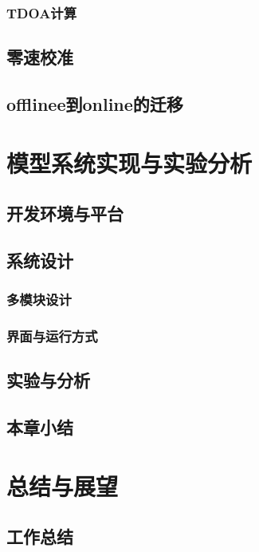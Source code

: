 \documentclass[winfonts]{njuthesis}
\begin{document}
		\subsection{}
		\subsection{TDOA计算}
	\section{零速校准}
	\section{offlinee到online的迁移}
	
\chapter{模型系统实现与实验分析}
	\section{开发环境与平台}
	\section{系统设计}
		\subsection{多模块设计}
		\subsection{界面与运行方式}
	\section{实验与分析}
	\section{本章小结}
\chapter{总结与展望}
	\section{工作总结}
\end{document}
